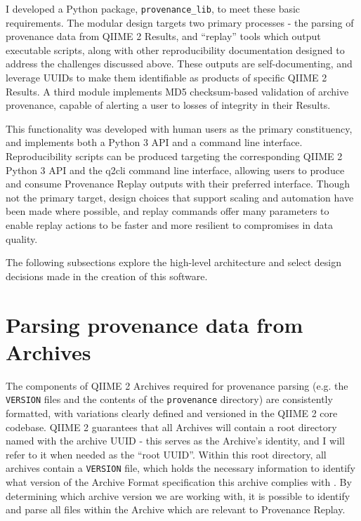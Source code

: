 I developed a Python package, \texttt{provenance\_lib}, to meet these basic
requirements.  The modular design targets two primary processes - the parsing of
provenance data from QIIME 2 Results, and “replay” tools which output executable
scripts, along with other reproducibility documentation designed to address the
challenges discussed above. These outputs are self-documenting, and leverage
UUIDs to make them identifiable as products of specific QIIME 2 Results. A third
module implements MD5 checksum-based validation of archive provenance, capable
of alerting a user to losses of integrity in their Results. 

This functionality was developed with human users as the primary constituency,
and implements both a Python 3 API and a command line interface. Reproducibility
scripts can be produced targeting the corresponding QIIME 2 Python 3 API and the
q2cli command line interface, allowing users to produce and consume Provenance
Replay outputs with their preferred interface. Though not the primary target,
design choices that support scaling and automation have been made where
possible, and replay commands offer many parameters to enable replay actions to
be faster and more resilient to compromises in data quality.

The following subsections explore the high-level architecture and select design
decisions made in the creation of this software.

\section{Parsing provenance data from Archives}

The components of QIIME 2 Archives required for provenance parsing (e.g. the
\texttt{VERSION} files and the contents of the \texttt{provenance} directory) are consistently
formatted, with variations clearly defined and versioned in the QIIME 2 core
codebase. QIIME 2 guarantees that all Archives will contain a root directory
named with the archive UUID - this serves as the Archive’s identity, and I will
refer to it when needed as the “root UUID”. Within this root directory, all
archives contain a \texttt{VERSION} file, which holds the necessary information to
identify what version of the Archive Format specification this archive complies
with \parencite{qiime_2_development_team_anatomy_2018}. By determining which
archive version we are working with, it is possible to identify and parse all
files within the Archive which are relevant to Provenance Replay.

